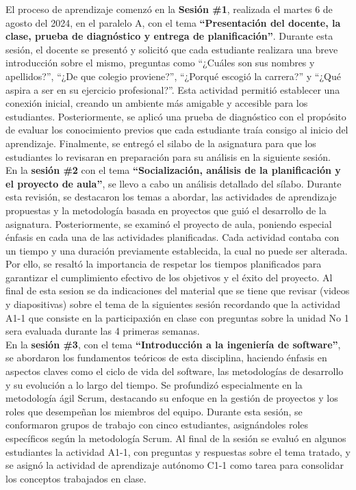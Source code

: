 \documentclass[12pt]{article}
\begin{document}
\begin{multicols}{2}

El proceso de aprendizaje comenzó  en la  \textbf{Sesión \#1}, realizada el martes 6 de agosto del 2024, en el paralelo A, con el tema \textbf{``Presentación del docente, la clase, prueba de diagnóstico y entrega de planificación''}. Durante esta sesión, el docente se presentó y solicitó que cada estudiante realizara una breve introducción sobre el mismo, preguntas como ``¿Cuáles son sus nombres y apellidos?'', ``¿De que colegio proviene?'', ``¿Porqué escogió la carrera?'' y ``¿Qué aspira a ser en su ejercicio profesional?''. Esta actividad permitió establecer una conexión inicial, creando un ambiente más amigable y accesible para los estudiantes. Posteriormente, se aplicó una prueba de diagnóstico con el propósito de evaluar los conocimiento previos que cada estudiante traía consigo al inicio del aprendizaje. Finalmente, se entregó el silabo de la asignatura para que los estudiantes lo revisaran en preparación para su análisis en la siguiente sesión. \\
En la \textbf{sesión \#2} con el tema \textbf{``Socialización, análisis de la planificación y el proyecto de aula''}, se llevo a cabo un análisis detallado del sílabo. Durante esta revisión, se destacaron los temas a abordar, las actividades de aprendizaje propuestas y la metodología basada en proyectos que guió el desarrollo de la asignatura. Posteriormente, se examinó el proyecto de aula, poniendo especial énfasis en cada una de las actividades planificadas. Cada actividad contaba con un tiempo y una duración previamente establecida, la cual no puede ser alterada. Por ello, se resaltó la importancia de respetar los tiempos planificados para garantizar el cumplimiento efectivo de los objetivos y el éxito del proyecto. Al final de esta sesion se da indicaciones del material que se tiene que revisar (videos y diapositivas) sobre el tema de la siguientes  sesión recordando que la actividad A1-1 que consiste en la participaxión en clase con preguntas sobre la unidad No 1 sera evaluada durante las 4 primeras semanas.\\
En la \textbf{sesión \#3}, con el tema \textbf{``Introducción a la ingeniería de software''}, se abordaron los fundamentos teóricos de esta disciplina, haciendo énfasis en aspectos claves como el ciclo de vida del software, las metodologías de desarrollo y su evolución  a lo largo del tiempo. Se profundizó especialmente en la metodología ágil Scrum, destacando su enfoque en la gestión de proyectos y los roles que desempeñan los miembros del equipo. Durante esta sesión, se conformaron grupos de trabajo con cinco estudiantes, asignándoles roles específicos según la metodología Scrum.  Al final de la sesión se evaluó en algunos estudiantes la actividad A1-1, con preguntas y respuestas sobre el tema tratado, y se asignó la actividad de aprendizaje autónomo C1-1 como tarea para consolidar los conceptos trabajados en clase.  \\

\end{multicols}
\end{document}
